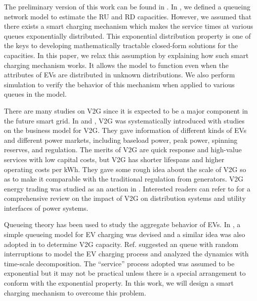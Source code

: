 \documentclass[journal]{IEEEtran}
\begin{document}
The preliminary version of this work can be found in \cite{smartgridcomm2012}.
In \cite{smartgridcomm2012}, we defined a queueing network model to estimate the RU and RD capacities. However, we assumed that there exists a smart charging mechanism which makes the service times at various queues exponentially distributed. This exponential distribution property is one of the keys to developing mathematically tractable closed-form solutions for the capacities. In this paper, we relax this assumption by explaining how such  smart charging mechanism works. It allows the model to function even when the attributes of EVs are distributed in unknown distributions. We also perform simulation to verify the behavior of this mechanism when applied to various queues in the model.

There are many studies on V2G since it is expected to be a major component in
the future smart grid.  In \cite{V2G_fundamentals} and
\cite{V2G_implementation}, V2G was systematically introduced with studies on the business model for V2G.  They gave information of
different kinds of EVs and different power markets, including baseload power,
peak power, spinning reserves, and regulation.  The merits of V2G are quick
response and high-value services with low capital costs, but V2G has shorter
lifespans and higher operating costs per kWh.  
They gave some rough idea about the scale of V2G so as to make it comparable
with the traditional regulation from generators.  
V2G energy trading was studied as an auction in \cite{doublelayer}. 
Interested readers can refer
to \cite{impact_review} for a comprehensive review on the impact of V2G on
distribution systems and utility interfaces of power systems.

Queueing theory has been used to study the aggregate behavior of EVs.
In \cite{EV_loadflow}, a simple  queueing model for EV charging was
devised and a similar idea was also adopted in \cite{V2GParking} to determine V2G capacity. 
Ref. \cite{chargingmodel} suggested an  queue with random interruptions to model the EV charging process and analyzed the dynamics with time-scale decomposition. 
The ``service'' process adopted was assumed to be exponential but it may not be practical unless there is a special arrangement to conform with the exponential property. In this work, we will design a smart charging mechanism to overcome this problem.
\end{document}
